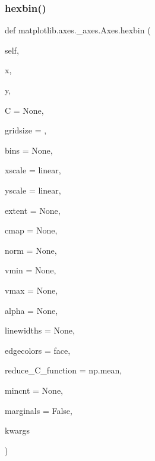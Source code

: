 \subsubsection{\texorpdfstring{hexbin()}{hexbin()}}
{\footnotesize\ttfamily def matplotlib.\+axes.\+\_\+axes.\+Axes.\+hexbin (\begin{DoxyParamCaption}\item[{}]{self,  }\item[{}]{x,  }\item[{}]{y,  }\item[{}]{C = {\ttfamily None},  }\item[{}]{gridsize = {},  }\item[{}]{bins = {\ttfamily None},  }\item[{}]{xscale = {\ttfamily \textquotesingle{}linear\textquotesingle{}},  }\item[{}]{yscale = {\ttfamily \textquotesingle{}linear\textquotesingle{}},  }\item[{}]{extent = {\ttfamily None},  }\item[{}]{cmap = {\ttfamily None},  }\item[{}]{norm = {\ttfamily None},  }\item[{}]{vmin = {\ttfamily None},  }\item[{}]{vmax = {\ttfamily None},  }\item[{}]{alpha = {\ttfamily None},  }\item[{}]{linewidths = {\ttfamily None},  }\item[{}]{edgecolors = {\ttfamily \textquotesingle{}face\textquotesingle{}},  }\item[{}]{reduce\+\_\+\+C\+\_\+function = {\ttfamily np.mean},  }\item[{}]{mincnt = {\ttfamily None},  }\item[{}]{marginals = {\ttfamily False},  }\item[{}]{kwargs }\end{DoxyParamCaption})}

